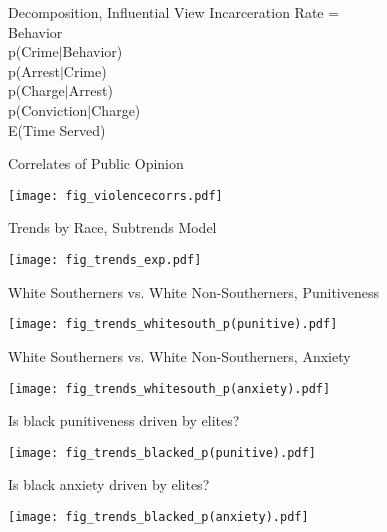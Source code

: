 \documentclass{beamer}
\begin{document}
\begin{frame}{Decomposition, Influential View}
Incarceration Rate = \\
Behavior \times \\ 
\alert{p(Crime$|$Behavior) \times \\ 
p(Arrest$|$Crime) \times \\ 
p(Charge$|$Arrest) \times \\ 
p(Conviction$|$Charge) \times \\ 
E(Time Served)}
\end{frame}

\begin{frame}{Correlates of Public Opinion}
\begin{center}
    \texttt{[image: fig\_violencecorrs.pdf]}
\end{center}
\end{frame}

\begin{frame}{Trends by Race, Subtrends Model}
\begin{center}
    \texttt{[image: fig\_trends\_exp.pdf]}
\end{center}
\end{frame}

\begin{frame}{White Southerners vs. White Non-Southerners, Punitiveness}
\begin{center}
    \texttt{[image: fig\_trends\_whitesouth\_p(punitive).pdf]}
\end{center}
\end{frame}

\begin{frame}{White Southerners vs. White Non-Southerners, Anxiety}
\begin{center}
    \texttt{[image: fig\_trends\_whitesouth\_p(anxiety).pdf]}
\end{center}
\end{frame}

\begin{frame}{Is black punitiveness driven by elites?}
\begin{center}
    \texttt{[image: fig\_trends\_blacked\_p(punitive).pdf]}
\end{center}
\end{frame}

\begin{frame}{Is black anxiety driven by elites?}
\begin{center}
    \texttt{[image: fig\_trends\_blacked\_p(anxiety).pdf]}
\end{center}
\end{frame}
\end{document}
